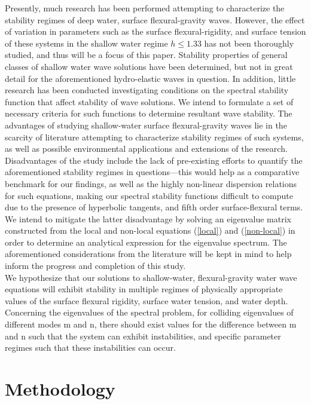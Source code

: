 \documentclass{article}
\begin{document}
Presently, much research has been performed attempting to characterize the stability regimes of deep water, surface flexural-gravity waves. However, the effect of variation in parameters such as the surface flexural-rigidity, and surface tension of these systems in the shallow water regime \(h \leq 1.33\) has not been thoroughly studied, and thus will be a focus of this paper. Stability properties of general classes of shallow water wave solutions have been determined, but not in great detail for the aforementioned hydro-elastic waves in question.  In addition, little research has been conducted investigating conditions on the spectral stability function that affect stability of wave solutions. We intend to formulate a set of necessary criteria for such functions to determine resultant wave stability. The advantages of studying shallow-water surface flexural-gravity waves lie in the scarcity of literature attempting to characterize stability regimes of such systems, as well as possible environmental applications and extensions of the research. Disadvantages of the study include the lack of pre-existing efforts to quantify the aforementioned stability regimes in questions—this would help as a comparative benchmark for our findings, as well as the highly non-linear dispersion relations for such equations, making our spectral stability functions difficult to compute due to the presence of hyperbolic tangents, and fifth order surface-flexural terms. We intend to mitigate the latter disadvantage by solving an eigenvalue matrix constructed from the local and non-local equations (\ref{local}) and (\ref{non-local}) in order to determine an analytical expression for the eigenvalue spectrum. The aforementioned considerations from the literature will be kept in mind to help inform the progress and completion of this study. 
\\
We hypothesize that our solutions to shallow-water, flexural-gravity water wave equations will exhibit stability in multiple regimes of physically appropriate values of the surface flexural rigidity, surface water tension, and water depth. Concerning the eigenvalues of the spectral problem, for colliding eigenvalues of different modes m and n, there should exist values for the difference between m and n such that the system can exhibit instabilities, and specific parameter regimes such that these instabilities can occur. 
\\

\section{Methodology}
\end{document}

